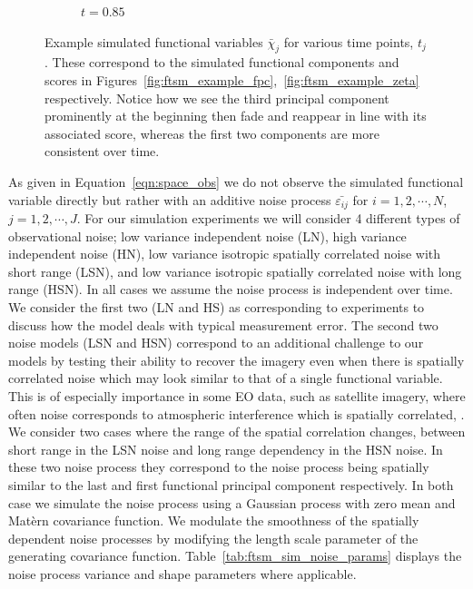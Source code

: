 \begin{figure}
\begin{subfigure}[b]{0.45\textwidth}
		\caption{$t=0.85$}
	\end{subfigure}
	\caption{Example simulated functional variables $\bar{\chi}_j$ for various time points, $t_j$. These correspond to the simulated functional components and scores in Figures~\ref{fig:ftsm_example_fpc},~\ref{fig:ftsm_example_zeta} respectively. Notice how we see the third principal component prominently at the beginning then fade and reappear in line with its associated score, whereas the first two components are more consistent over time.}
	\label{fig:ftsm_chi_example}
\end{figure}

As given in Equation~\ref{eqn:space_obs} we do not observe the simulated functional variable directly but rather with an additive noise process $\bar{\varepsilon_{ij}}$ for $i=1,2,\cdots, N$, $j=1,2,\cdots, J$.
For our simulation experiments we will consider 4 different types of observational noise; low variance independent noise (LN), high variance independent noise (HN), low variance isotropic spatially correlated noise with short range (LSN), and low variance isotropic spatially correlated noise with long range (HSN).
In all cases we assume the noise process is independent over time. 
We consider the first two (LN and HS) as corresponding to experiments to discuss how the model deals with typical measurement error. 
The second two noise models (LSN and HSN) correspond to an additional challenge to our models by testing their ability to recover the imagery even when there is spatially correlated noise which may look similar to that of a single functional variable. 
This is of especially importance in some EO data, such as satellite imagery, where often noise corresponds to atmospheric interference which is spatially correlated, \citep{oliver_understanding_2004}. 
We consider two cases where the range of the spatial correlation changes, between short range in the LSN noise and long range
 dependency in the HSN noise. 
In these two noise process they correspond to the noise process being spatially similar to the last and first functional principal component respectively.
 In both case we simulate the noise process using a Gaussian process with zero mean and  Mat\`{e}rn covariance function. 
 We modulate the smoothness of the spatially dependent noise processes by modifying  the length scale parameter of the generating covariance function.
 Table~\ref{tab:ftsm_sim_noise_params} displays the noise process variance and shape parameters where applicable. 
 
